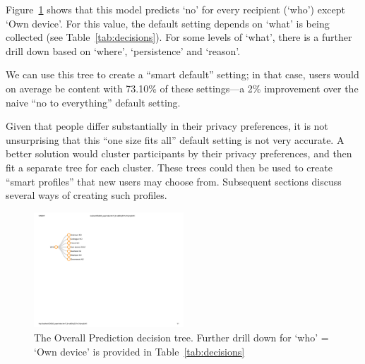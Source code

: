 Figure~\ref{fig:naive_cls} shows that this model predicts `no' for every recipient (`who') except `Own device'. For this value, the default setting depends on `what' is being collected (see Table~\ref{tab:decisions}). For some levels of `what', there is a further drill down based on `where', `persistence' and `reason'.

We can use this tree to create a ``smart default'' setting; in that case, users would on average be content with 73.10\% of these settings---a 2\% improvement over the naive ``no to everything'' default setting. 

Given that people differ substantially in their privacy preferences, it is not unsurprising that this ``one size fits all'' default setting is not very accurate. A better solution would cluster participants by their privacy preferences, and then fit a separate tree for each cluster. These trees could then be used to create ``smart profiles'' that new users may choose from. Subsequent sections discuss several ways of creating such profiles.

\begin{figure}
	\centering
	\includegraphics[width=0.5\textwidth]{figures/overall.pdf}
	\caption{The Overall Prediction decision tree. Further drill down for `who' = `Own device' is provided in Table~\ref{tab:decisions}}
	\label{fig:naive_cls}
\end{figure}

